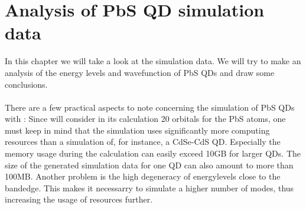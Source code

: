 \chapter{Analysis of PbS QD simulation data}
	In this chapter we will take a look at the simulation data. We will try to make an analysis of the energy levels and wavefunction of PbS QDs and draw some conclusions.\\
	\\
	There are a few practical aspects to note concerning the simulation of PbS QDs with \omen: Since \omen will consider in its calculation 20 orbitals for the PbS atoms, one must keep in mind that the simulation uses significantly more computing resources than a simulation of, for instance, a CdSe-CdS QD. Especially the memory usage during the calculation can easily exceed 10GB for larger QDs. The size of the generated simulation data for one QD can also amount to more than 100MB. Another problem is the high degeneracy of energylevels close to the bandedge. This makes it necessarry to simulate a higher number of modes, thus increasing the usage of resources further.


